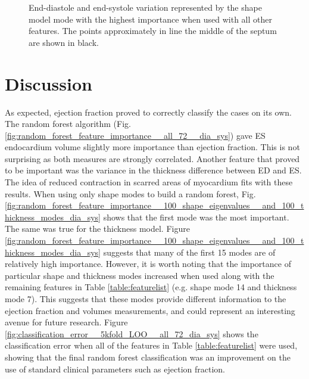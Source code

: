 \documentclass{llncs}
\begin{document}
	\begin{figure}[]	
	\!		
\begin{center}   
\qquad
{}
\caption{ End-diastole and end-systole variation represented by the shape model mode with the highest importance when used with all other features. The points approximately in line the middle of the septum are shown in black. }
\label{fig:visualise_shapes}
\end{center}
		\end{figure}

\section{Discussion}
As expected, ejection fraction proved to correctly classify the cases on its own. The random forest algorithm (Fig. \ref{fig:random_forest_feature_importance__all_72__dia_sys}) gave ES endocardium volume slightly more importance than ejection fraction. This is not surprising as both measures are strongly correlated. Another feature that proved to be important was the variance in the thickness difference between ED and ES. The idea of reduced contraction in scarred areas of myocardium fits with these results.
When using only shape modes to build a random forest, Fig.     \ref{fig:random_forest_feature_importance__100_shape_eigenvalues__and_100_thickness_modes_dia_sys} shows that the first mode was the most important. The same was true for the thickness model. Figure \ref{fig:random_forest_feature_importance__100_shape_eigenvalues__and_100_thickness_modes_dia_sys} suggests that many of the first 15 modes are of relatively high importance. However, it is worth noting that the importance of particular shape and thickness modes increased when used along with the remaining features in Table \ref{table:featurelist} (e.g. shape mode 14 and thickness mode 7). This suggests that these modes provide different information to the ejection fraction and volumes measurements, and could represent an interesting avenue for future research.
Figure \ref{fig:classification_error__5kfold_LOO__all_72_dia_sys} shows the classification error when all of the features in Table \ref{table:featurelist} were used, showing that the final random forest classification was an improvement on the use of standard clinical parameters such as ejection fraction.
\end{document}
